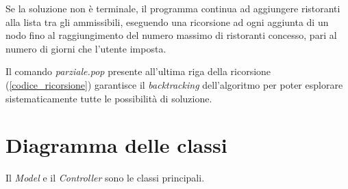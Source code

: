 \documentclass{report}
\begin{document}
Se la soluzione non è terminale, il programma continua ad aggiungere ristoranti alla lista tra gli ammissibili, eseguendo una ricorsione ad ogni aggiunta di un nodo fino al raggiungimento del numero massimo di ristoranti concesso, pari al numero di giorni che l'utente imposta.

Il comando \textit{parziale.pop} presente all'ultima riga della ricorsione (\ref{codice_ricorsione}) garantisce il \textit{backtracking} dell'algoritmo per poter esplorare sistematicamente tutte le possibilità di soluzione.


\chapter{Diagramma delle classi}\label{cap_diagramma}
Il \textit{Model} e il \textit{Controller} sono le classi principali.
\end{document}
